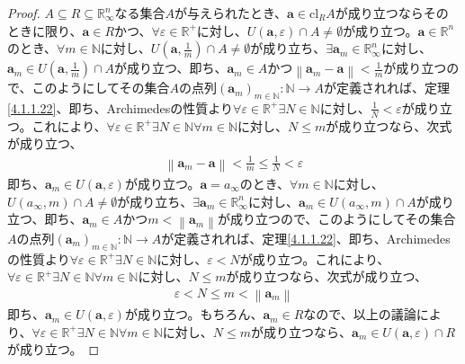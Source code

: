 \documentclass[dvipdfmx]{jsarticle}
\begin{document}
\begin{proof}
$A \subseteq R \subseteq \mathbb{R}_{\infty}^{n}$なる集合$A$が与えられたとき、$\mathbf{a} \in \mathrm{cl}_{R}A$が成り立つならそのときに限り、$\mathbf{a} \in R$かつ、$\forall\varepsilon \in \mathbb{R}^{+}$に対し、$U\left( \mathbf{a},\varepsilon \right) \cap A \neq \emptyset$が成り立つ。$\mathbf{a} \in \mathbb{R}^{n}$のとき、$\forall m \in \mathbb{N}$に対し、$U\left( \mathbf{a},\frac{1}{m} \right) \cap A \neq \emptyset$が成り立ち、$\exists\mathbf{a}_{m} \in \mathbb{R}_{\infty}^{n}$に対し、$\mathbf{a}_{m} \in U\left( \mathbf{a},\frac{1}{m} \right) \cap A$が成り立つ、即ち、$\mathbf{a}_{m} \in A$かつ$\left\| \mathbf{a}_{m} - \mathbf{a} \right\| < \frac{1}{m}$が成り立つので、このようにしてその集合$A$の点列$\left( \mathbf{a}_{m} \right)_{m \in \mathbb{N}}:\mathbb{N} \rightarrow A$が定義されれば、定理\ref{4.1.1.22}、即ち、Archimedesの性質より$\forall\varepsilon \in \mathbb{R}^{+}\exists N \in \mathbb{N}$に対し、$\frac{1}{N} < \varepsilon$が成り立つ。これにより、$\forall\varepsilon \in \mathbb{R}^{+}\exists N \in \mathbb{N}\forall m \in \mathbb{N}$に対し、$N \leq m$が成り立つなら、次式が成り立つ、
\begin{align*}
\left\| \mathbf{a}_{m} - \mathbf{a} \right\| < \frac{1}{m} \leq \frac{1}{N} < \varepsilon
\end{align*}
即ち、$\mathbf{a}_{m} \in U\left( \mathbf{a},\varepsilon \right)$が成り立つ。$\mathbf{a} = a_{\infty}$のとき、$\forall m \in \mathbb{N}$に対し、$U\left( a_{\infty},m \right) \cap A \neq \emptyset$が成り立ち、$\exists\mathbf{a}_{m} \in \mathbb{R}_{\infty}^{n}$に対し、$\mathbf{a}_{m} \in U\left( a_{\infty},m \right) \cap A$が成り立つ、即ち、$\mathbf{a}_{m} \in A$かつ$m < \left\| \mathbf{a}_{m} \right\|$が成り立つので、このようにしてその集合$A$の点列$\left( \mathbf{a}_{m} \right)_{m \in \mathbb{N}}:\mathbb{N} \rightarrow A$が定義されれば、定理\ref{4.1.1.22}、即ち、Archimedesの性質より$\forall\varepsilon \in \mathbb{R}^{+}\exists N \in \mathbb{N}$に対し、$\varepsilon < N$が成り立つ。これにより、$\forall\varepsilon \in \mathbb{R}^{+}\exists N \in \mathbb{N}\forall m \in \mathbb{N}$に対し、$N \leq m$が成り立つなら、次式が成り立つ、
\begin{align*}
\varepsilon < N \leq m < \left\| \mathbf{a}_{m} \right\|
\end{align*}
即ち、$\mathbf{a}_{m} \in U\left( \mathbf{a},\varepsilon \right)$が成り立つ。もちろん、$\mathbf{a}_{m} \in R$なので、以上の議論により、$\forall\varepsilon \in \mathbb{R}^{+}\exists N \in \mathbb{N}\forall m \in \mathbb{N}$に対し、$N \leq m$が成り立つなら、$\mathbf{a}_{m} \in U\left( \mathbf{a},\varepsilon \right) \cap R$が成り立つ。\par

\end{proof}
\end{document}
